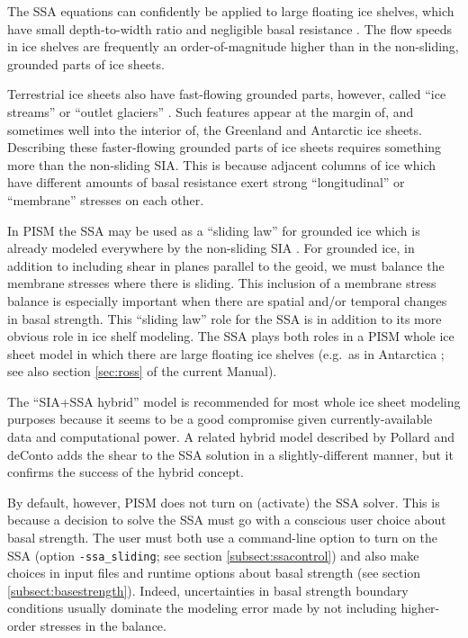 The SSA equations can confidently be applied to large floating ice shelves, which have small depth-to-width ratio and negligible basal resistance \cite{Morland,MorlandZainuddin}.  The flow speeds in ice shelves are frequently an order-of-magnitude higher than in the non-sliding, grounded parts of ice sheets.

Terrestrial ice sheets also have fast-flowing grounded parts, however, called ``ice streams'' or ``outlet glaciers'' \cite{TrufferEchelmeyer}.  Such features appear at the margin of, and sometimes well into the interior of, the Greenland \cite{Joughinetal2001} and Antarctic \cite{BamberVaughanJoughin} ice sheets.  Describing these faster-flowing grounded parts of ice sheets requires something more than the non-sliding SIA.  This is because adjacent columns of ice which have different amounts of basal resistance exert strong ``longitudinal'' or ``membrane'' stresses \cite{SchoofStream} on each other.

In PISM the SSA may be used as a ``sliding law'' for grounded ice which is already modeled everywhere by the non-sliding SIA \cite{BBssasliding,Winkelmannetal2011}.  For grounded ice, in addition to including shear in planes parallel to the geoid, we must balance the membrane stresses where there is sliding.  This inclusion of a membrane stress balance is especially important when there are spatial and/or temporal changes in basal strength.  This ``sliding law'' role for the SSA is in addition to its more obvious role in ice shelf modeling.  The SSA plays both roles in a PISM whole ice sheet model in which there are large floating ice shelves (e.g.~as in Antarctica \cite{Golledgeetal2012ant,Martinetal2011,Winkelmannetal2011}; see also section \ref{sec:ross} of the current Manual).

The ``SIA+SSA hybrid'' model is recommended for most whole ice sheet modeling purposes because it seems to be a good compromise given currently-available data and computational power.  A related hybrid model described by Pollard and deConto \cite{PollardDeConto} adds the shear to the SSA solution in a slightly-different manner, but it confirms the success of the hybrid concept.

By default, however, PISM does not turn on (activate) the SSA solver.  This is because a decision to solve the SSA must go with a conscious user choice about basal strength.  The user must both use a command-line option to turn on the SSA (option \texttt{-ssa_sliding}; see section \ref{subsect:ssacontrol}) and also make choices in input files and runtime options about basal strength (see section \ref{subsect:basestrength}).  Indeed, uncertainties in basal strength boundary conditions usually dominate the modeling error made by not including higher-order stresses in the balance.  

